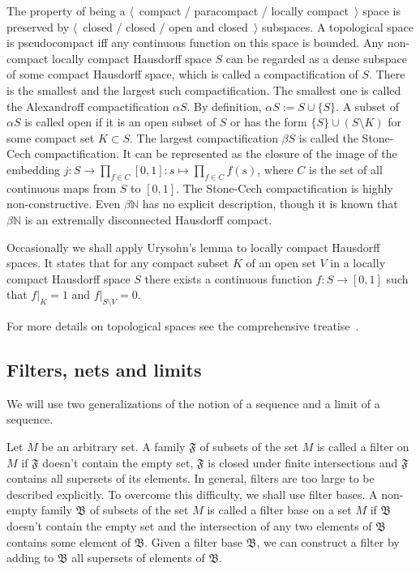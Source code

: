 The property of being a $\langle$~compact / paracompact / locally
compact~$\rangle$ space is preserved by $\langle$~closed / closed / open and
closed~$\rangle$ subspaces. A topological space is pseudocompact iff any
continuous function on this space is bounded. Any non-compact locally compact
Hausdorff space $S$ can be regarded as a dense subspace of some compact Hausdorff
space, which is called a compactification of $S$. There is the smallest and 
the largest such compactification. The smallest
one is called the Alexandroff compactification $\alpha S$.  By definition,
$\alpha S:=S\cup  \{S \}$. A subset of $\alpha S$ is called open if it is an
open subset of $S$ or has the form $ \{S \}\cup (S\setminus K)$ for some compact
set $K\subset S$. The largest compactification $\beta S$ is called the
Stone-Cech compactification. It can be represented as the closure of the image
of the embedding
$j:S\to\prod_{f\in C}[0,1]:s\mapsto \prod_{f\in C}f(s)$, where $C$ is the set of
all continuous maps from $S$ to $[0,1]$. The Stone-Cech compactification is highly
non-constructive. Even $\beta\mathbb{N}$ has no explicit description, though it
is known that $\beta\mathbb{N}$ is an extremally disconnected Hausdorff compact.

Occasionally we shall apply Urysohn's lemma to locally compact Hausdorff
spaces. It states that for any compact subset $K$ of an open set $V$ in a locally
compact Hausdorff space $S$ there exists a continuous function $f:S\to [0,1]$
such that $f|_K=1$ and $f|_{S\setminus V}=0$. 

For more details on topological spaces see the comprehensive
treatise~\cite{EngelGenTop}. 


\subsection{
  Filters, nets and limits}\label{SubSectionFiltersNetsAndLimits} 

We will use two generalizations of the notion of a sequence and a limit of
a sequence.

Let $M$ be an arbitrary set. A family $\mathfrak{F}$ of subsets of the set $M$ 
is called a filter on $M$ if $\mathfrak{F}$ doesn't contain the empty set, 
$\mathfrak{F}$ is closed under finite intersections and $\mathfrak{F}$ contains 
all supersets of its elements. In general, filters are too large to be described 
explicitly. To overcome this difficulty, we shall use filter bases. A non-empty 
family $\mathfrak{B}$ of subsets of the set $M$ is called a filter base on 
a set $M$ if $\mathfrak{B}$ doesn't contain the empty set and the intersection of 
any two elements of $\mathfrak{B}$ contains some element of $\mathfrak{B}$. 
Given a filter base $\mathfrak{B}$, we can construct a filter by adding 
to $\mathfrak{B}$ all supersets of elements of $\mathfrak{B}$.

